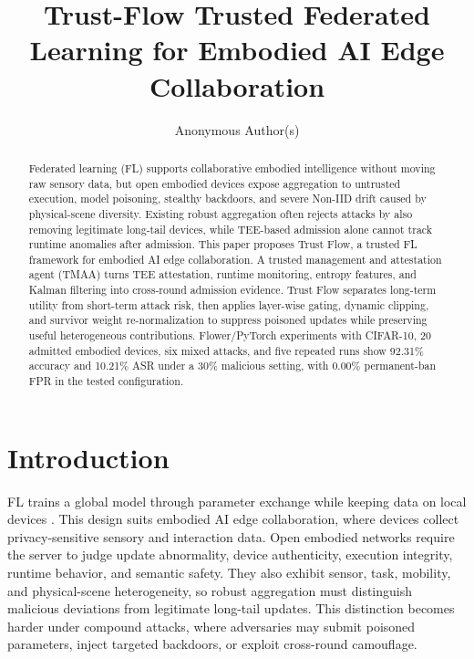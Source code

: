 \documentclass[runningheads,orivec]{llncs}
\begin{document}
\title{Trust-Flow Trusted Federated Learning for Embodied AI Edge Collaboration}

\author{Anonymous Author(s)}
\institute{}

\maketitle

\begin{abstract}
    Federated learning (FL) supports collaborative embodied intelligence without moving raw sensory data, but open embodied devices expose aggregation to untrusted execution, model poisoning, stealthy backdoors, and severe Non-IID drift caused by physical-scene diversity. Existing robust aggregation often rejects attacks by also removing legitimate long-tail devices, while TEE-based admission alone cannot track runtime anomalies after admission. This paper proposes Trust Flow, a trusted FL framework for embodied AI edge collaboration. A trusted management and attestation agent (TMAA) turns TEE attestation, runtime monitoring, entropy features, and Kalman filtering into cross-round admission evidence. Trust Flow separates long-term utility from short-term attack risk, then applies layer-wise gating, dynamic clipping, and survivor weight re-normalization to suppress poisoned updates while preserving useful heterogeneous contributions. Flower/PyTorch experiments with CIFAR-10, 20 admitted embodied devices, six mixed attacks, and five repeated runs show 92.31\% accuracy and 10.21\% ASR under a 30\% malicious setting, with 0.00\% permanent-ban FPR in the tested configuration.
\end{abstract}

\section{Introduction}

FL trains a global model through parameter exchange while keeping data on local devices \cite{kairouz2021flsurvey,mcmahan2017fedavg}. This design suits embodied AI edge collaboration, where devices collect privacy-sensitive sensory and interaction data. Open embodied networks require the server to judge update abnormality, device authenticity, execution integrity, runtime behavior, and semantic safety. They also exhibit sensor, task, mobility, and physical-scene heterogeneity, so robust aggregation must distinguish malicious deviations from legitimate long-tail updates. This distinction becomes harder under compound attacks, where adversaries may submit poisoned parameters, inject targeted backdoors, or exploit cross-round camouflage.
\end{document}
